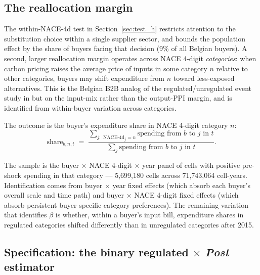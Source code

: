 \subsection{The reallocation margin}

The within-NACE-4d test in Section~\ref{sec:test_h} restricts attention to the substitution choice within a single supplier sector, and bounds the population effect by the share of buyers facing that decision (9\% of all Belgian buyers). A second, larger reallocation margin operates across NACE 4-digit \emph{categories}: when carbon pricing raises the average price of inputs in some category $n$ relative to other categories, buyers may shift expenditure from $n$ toward less-exposed alternatives. This is the Belgian B2B analog of the regulated/unregulated event study in \citet{colmeretal2023} but on the input-mix rather than the output-PPI margin, and is identified from within-buyer variation across categories.

The outcome is the buyer's expenditure share in NACE 4-digit category $n$:
\begin{equation}
    \text{share}_{b,n,t} \;=\; \frac{\sum_{j: \text{ NACE-4d}_j = n} \text{spending from } b \text{ to } j \text{ in } t}{\sum_{j} \text{spending from } b \text{ to } j \text{ in } t}.
    \label{eq:share_bnt}
\end{equation}

The sample is the buyer $\times$ NACE 4-digit $\times$ year panel of cells with positive pre-shock spending in that category --- 5{,}699{,}180 cells across 71{,}743{,}064 cell-years. Identification comes from buyer $\times$ year fixed effects (which absorb each buyer's overall scale and time path) and buyer $\times$ NACE 4-digit fixed effects (which absorb persistent buyer-specific category preferences). The remaining variation that identifies $\beta$ is whether, within a buyer's input bill, expenditure shares in regulated categories shifted differently than in unregulated categories after 2015.

\subsection{Specification: the binary regulated $\times$ \textit{Post} estimator}

